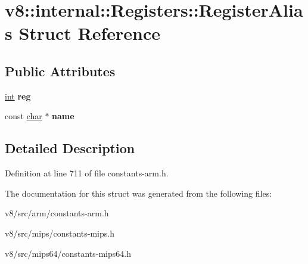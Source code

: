 \hypertarget{structv8_1_1internal_1_1Registers_1_1RegisterAlias}{}\section{v8\+:\+:internal\+:\+:Registers\+:\+:Register\+Alias Struct Reference}
\label{structv8_1_1internal_1_1Registers_1_1RegisterAlias}
\subsection*{Public Attributes}
\begin{DoxyCompactItemize}
\item 
\mbox{\label{structv8_1_1internal_1_1Registers_1_1RegisterAlias_a8dc157b50ccc8a51abb1a30702240f40}} 
\mbox{\hyperlink{classint}{int}} {\bfseries reg}
\item 
\mbox{\label{structv8_1_1internal_1_1Registers_1_1RegisterAlias_abb530b1c04ec3c9043673000c46af11d}} 
const \mbox{\hyperlink{classchar}{char}} $\ast$ {\bfseries name}
\end{DoxyCompactItemize}


\subsection{Detailed Description}


Definition at line 711 of file constants-\/arm.\+h.



The documentation for this struct was generated from the following files\+:\begin{DoxyCompactItemize}
\item 
v8/src/arm/constants-\/arm.\+h\item 
v8/src/mips/constants-\/mips.\+h\item 
v8/src/mips64/constants-\/mips64.\+h\end{DoxyCompactItemize}
